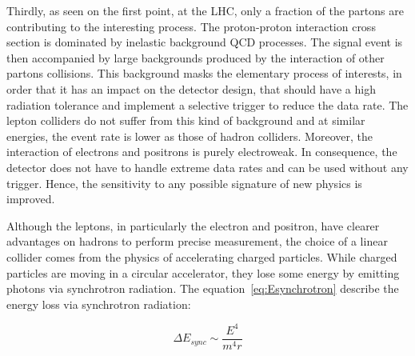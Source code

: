     Thirdly, as seen on the first point, at the \gls{LHC}, only a fraction of the partons are contributing to the interesting process. 
    The proton-proton interaction cross section is dominated by inelastic background QCD processes.
    The signal event is then accompanied by large backgrounds produced by the interaction of other partons collisions.
    This background masks the elementary process of interests, in order that it has an impact on the detector design, that should have a high radiation tolerance and implement a selective trigger to reduce the data rate.
    The lepton colliders do not suffer from this kind of background and at similar energies, the event rate is lower as those of hadron colliders.
    Moreover, the interaction of electrons and positrons is purely electroweak.
    In consequence, the detector does not have to handle extreme data rates and can be used without any trigger.
    Hence, the sensitivity to any possible signature of new physics is improved.

    Although the leptons, in particularly the electron and positron, have clearer advantages on hadrons to perform precise measurement, the choice of a linear collider comes from the physics of accelerating charged particles.
    While charged particles are moving in a circular accelerator, they lose some energy by emitting photons via synchrotron radiation.
    The equation~\ref{eq:Esynchrotron} describe the energy loss via synchrotron radiation:
    
    
    \begin{equation}
     \Delta E_{sync} \sim \frac{E^4}{m^4r}
       \label{eq:Esynchrotron}
    \end{equation} 

